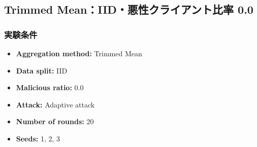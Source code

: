 \documentclass[a4j,twocolumn,dvipdfmx]{jsarticle}
\begin{document}
\subsection{Trimmed Mean：IID・悪性クライアント比率 0.0}

\subsubsection{実験条件}

\begin{itemize}
    \item \textbf{Aggregation method:} Trimmed Mean
    \item \textbf{Data split:} IID
    \item \textbf{Malicious ratio:} 0.0
    \item \textbf{Attack:} Adaptive attack
    \item \textbf{Number of rounds:} 20
    \item \textbf{Seeds:} 1, 2, 3
\end{itemize}

\end{document}
